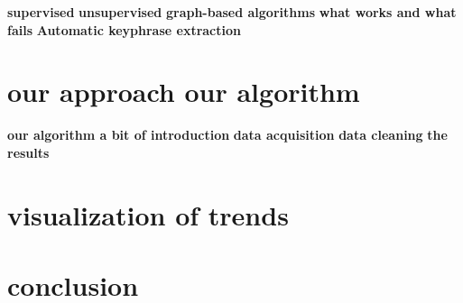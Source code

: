 \textbf{supervised} \newline
\textbf{unsupervised}\newline
\textbf{graph-based algorithms}\newline
\textbf{what works and what fails}\newline
\textbf {Automatic keyphrase extraction}
\section{our approach our algorithm}
\textbf{our algorithm a bit of introduction}\newline
\textbf{data acquisition}\newline
\textbf{data cleaning}\newline
\textbf{the results}\newline

\section{visualization of trends}

\section{conclusion}


